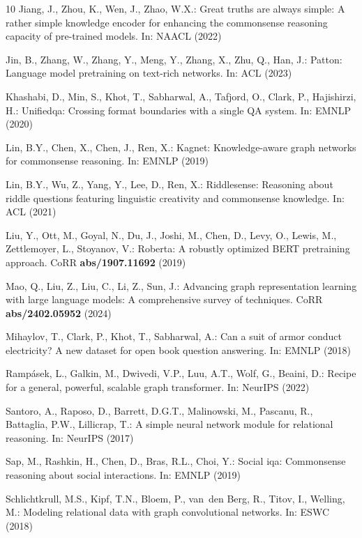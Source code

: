 \documentclass[runningheads]{llncs}
\begin{document}
\begin{thebibliography}{10}
Jiang, J., Zhou, K., Wen, J., Zhao, W.X.: Great truths are always simple: {A}
  rather simple knowledge encoder for enhancing the commonsense reasoning
  capacity of pre-trained models. In: NAACL (2022)

Jin, B., Zhang, W., Zhang, Y., Meng, Y., Zhang, X., Zhu, Q., Han, J.: Patton:
  Language model pretraining on text-rich networks. In: ACL (2023)

Khashabi, D., Min, S., Khot, T., Sabharwal, A., Tafjord, O., Clark, P.,
  Hajishirzi, H.: Unifiedqa: Crossing format boundaries with a single {QA}
  system. In: EMNLP (2020)

Lin, B.Y., Chen, X., Chen, J., Ren, X.: Kagnet: Knowledge-aware graph networks
  for commonsense reasoning. In: EMNLP (2019)

Lin, B.Y., Wu, Z., Yang, Y., Lee, D., Ren, X.: Riddlesense: Reasoning about
  riddle questions featuring linguistic creativity and commonsense knowledge.
  In: ACL (2021)

Liu, Y., Ott, M., Goyal, N., Du, J., Joshi, M., Chen, D., Levy, O., Lewis, M.,
  Zettlemoyer, L., Stoyanov, V.: Roberta: {A} robustly optimized {BERT}
  pretraining approach. CoRR  \textbf{abs/1907.11692} (2019)

Mao, Q., Liu, Z., Liu, C., Li, Z., Sun, J.: Advancing graph representation
  learning with large language models: {A} comprehensive survey of techniques.
  CoRR  \textbf{abs/2402.05952} (2024)

Mihaylov, T., Clark, P., Khot, T., Sabharwal, A.: Can a suit of armor conduct
  electricity? {A} new dataset for open book question answering. In: EMNLP
  (2018)

Ramp{\'{a}}sek, L., Galkin, M., Dwivedi, V.P., Luu, A.T., Wolf, G., Beaini, D.:
  Recipe for a general, powerful, scalable graph transformer. In: NeurIPS
  (2022)

Santoro, A., Raposo, D., Barrett, D.G.T., Malinowski, M., Pascanu, R.,
  Battaglia, P.W., Lillicrap, T.: A simple neural network module for relational
  reasoning. In: NeurIPS (2017)

Sap, M., Rashkin, H., Chen, D., Bras, R.L., Choi, Y.: Social iqa: Commonsense
  reasoning about social interactions. In: EMNLP (2019)

Schlichtkrull, M.S., Kipf, T.N., Bloem, P., van~den Berg, R., Titov, I.,
  Welling, M.: Modeling relational data with graph convolutional networks. In:
  ESWC (2018)


\end{thebibliography}
\end{document}
